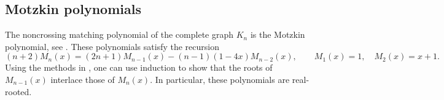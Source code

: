 \subsection[motzkinPolynomialsRealRooted]{Motzkin polynomials}

\begin{example*}

The noncrossing matching polynomial of the complete
graph $K_n$ is the Motzkin polynomial, see .
These polynomials satisfy the recursion
\[
 (n+2)M_n(x)
 = (2n+1)M_{n-1}(x) - (n-1)(1-4x)M_{n-2}(x),
 \qquad M_1(x)=1,\quad M_2(x)=x+1.
\]
Using the methods in \cite[Sec.~3]{Wagner1992},
one can use induction to show that the roots of $M_{n-1}(x)$ interlace those
of $M_{n}(x)$.  In particular, these polynomials are real-rooted.


\end{example*}
